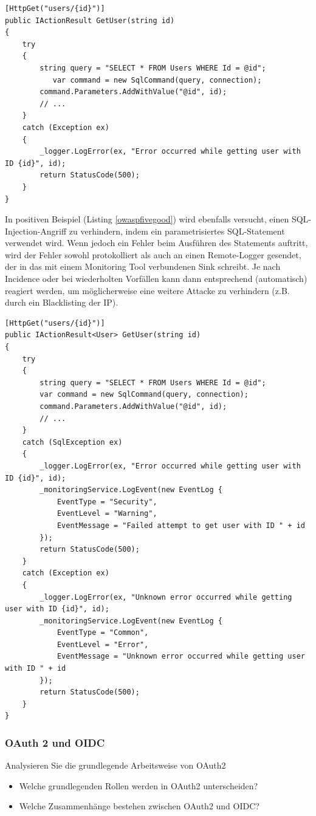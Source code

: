 \documentclass[notitlepage, hidelinks]{article}
\begin{document}
\begin{lstlisting}[language={[Sharp]C},frame=single,caption=Negativbeispiel Improper Assets Management,label=owaspfivebad]
[HttpGet("users/{id}")]
public IActionResult GetUser(string id)
{
    try
    {
        string query = "SELECT * FROM Users WHERE Id = @id";
    	   var command = new SqlCommand(query, connection);
        command.Parameters.AddWithValue("@id", id);
        // ...
    }
    catch (Exception ex)
    {
        _logger.LogError(ex, "Error occurred while getting user with ID {id}", id);
        return StatusCode(500);
    }
}
\end{lstlisting}

In positiven Beispiel (Listing \ref{owaspfivegood}) wird ebenfalls versucht, einen SQL-Injection-Angriff zu verhindern, indem ein parametrisiertes SQL-Statement verwendet wird. Wenn jedoch ein Fehler beim Ausführen des Statements auftritt, wird der Fehler sowohl protokolliert als auch an einen Remote-Logger gesendet, der in das mit einem Monitoring Tool verbundenen Sink schreibt. Je nach Incidence oder bei wiederholten Vorfällen kann dann entsprechend (automatisch) reagiert werden, um möglicherweise eine weitere Attacke zu verhindern (z.B. durch ein Blacklisting der IP).

\begin{lstlisting}[language={[Sharp]C},frame=single,caption=Positivbeispiel Improper Assets Management,label=owaspfivegood]
[HttpGet("users/{id}")]
public IActionResult<User> GetUser(string id)
{
    try
    {
        string query = "SELECT * FROM Users WHERE Id = @id";
        var command = new SqlCommand(query, connection);
        command.Parameters.AddWithValue("@id", id);
        // ...
    }
    catch (SqlException ex)
    {
        _logger.LogError(ex, "Error occurred while getting user with ID {id}", id);
        _monitoringService.LogEvent(new EventLog { 
            EventType = "Security",
            EventLevel = "Warning",
            EventMessage = "Failed attempt to get user with ID " + id
        });
        return StatusCode(500);
    }
    catch (Exception ex)
    {
        _logger.LogError(ex, "Unknown error occurred while getting user with ID {id}", id);
        _monitoringService.LogEvent(new EventLog { 
            EventType = "Common",
            EventLevel = "Error",
            EventMessage = "Unknown error occurred while getting user with ID " + id
        });
        return StatusCode(500);
    }
}
\end{lstlisting}


\subsubsection{OAuth 2 und OIDC}
Analysieren Sie die grundlegende Arbeitsweise von OAuth2
\begin{itemize}
\item Welche grundlegenden Rollen werden in OAuth2 unterscheiden?
\item Welche Zusammenhänge bestehen zwischen OAuth2 und OIDC?
\end{itemize}
\end{document}
